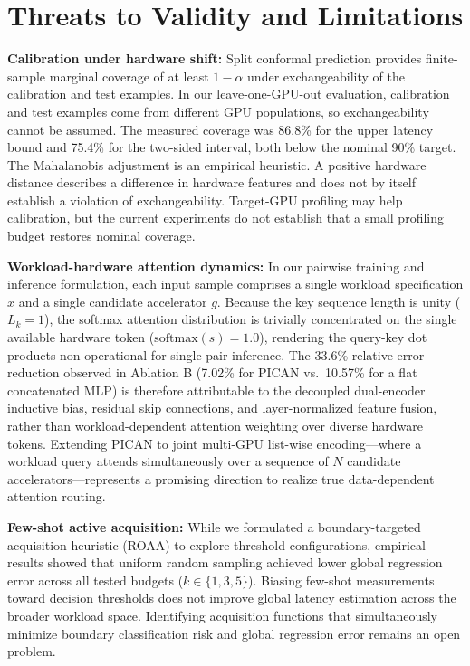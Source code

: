 \documentclass[preprint,12pt]{elsarticle}
\begin{document}
\section{Threats to Validity and Limitations}
\label{sec:threats}

\textbf{Calibration under hardware shift:}
Split conformal prediction provides finite-sample marginal coverage of
at least $1-\alpha$ under exchangeability of the calibration and test
examples. In our leave-one-GPU-out evaluation, calibration and test
examples come from different GPU populations, so exchangeability
cannot be assumed. The measured coverage was 86.8\% for the upper
latency bound and 75.4\% for the two-sided interval, both below the
nominal 90\% target. The Mahalanobis adjustment is an empirical
heuristic. A positive hardware distance describes a difference in
hardware features and does not by itself establish a violation of
exchangeability. Target-GPU profiling may help calibration, but
the current experiments do not establish that a small profiling
budget restores nominal coverage.

\textbf{Workload-hardware attention dynamics:}
In our pairwise training and inference formulation, each input sample comprises a single workload specification $x$ and a single candidate accelerator $g$. Because the key sequence length is unity ($L_k = 1$), the softmax attention distribution is trivially concentrated on the single available hardware token ($\mathrm{softmax}(s) = 1.0$), rendering the query-key dot products non-operational for single-pair inference. The 33.6\% relative error reduction observed in Ablation B (7.02\% for PICAN vs.\ 10.57\% for a flat concatenated MLP) is therefore attributable to the decoupled dual-encoder inductive bias, residual skip connections, and layer-normalized feature fusion, rather than workload-dependent attention weighting over diverse hardware tokens. Extending PICAN to joint multi-GPU list-wise encoding---where a workload query attends simultaneously over a sequence of $N$ candidate accelerators---represents a promising direction to realize true data-dependent attention routing.

\textbf{Few-shot active acquisition:}
While we formulated a boundary-targeted acquisition heuristic (ROAA) to explore threshold configurations, empirical results showed that uniform random sampling achieved lower global regression error across all tested budgets ($k \in \{1, 3, 5\}$). Biasing few-shot measurements toward decision thresholds does not improve global latency estimation across the broader workload space. Identifying acquisition functions that simultaneously minimize boundary classification risk and global regression error remains an open problem.
\end{document}
